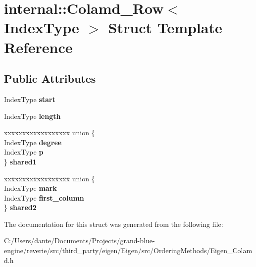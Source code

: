 \hypertarget{structinternal_1_1_colamd___row}{}\section{internal\+::Colamd\+\_\+\+Row$<$ Index\+Type $>$ Struct Template Reference}
\label{structinternal_1_1_colamd___row}
\subsection*{Public Attributes}
\begin{DoxyCompactItemize}
\item 
\mbox{\label{structinternal_1_1_colamd___row_ac6998584d9ff3a7eae40b632b0e63b43}} 
Index\+Type {\bfseries start}
\item 
\mbox{\label{structinternal_1_1_colamd___row_a061b6aba0ec750f7183a6ad248be7be6}} 
Index\+Type {\bfseries length}
\item 
\mbox{\label{structinternal_1_1_colamd___row_aa0956743d33cbd1625cd3174f37ac6b5}} 
\begin{tabbing}
xx\=xx\=xx\=xx\=xx\=xx\=xx\=xx\=xx\=\kill
union \{\\
\>IndexType {\bfseries degree}\\
\>IndexType {\bfseries p}\\
\} {\bfseries shared1}\\

\end{tabbing}\item 
\mbox{\label{structinternal_1_1_colamd___row_aa2af6d6cdeadc13001a73e42fd5130ff}} 
\begin{tabbing}
xx\=xx\=xx\=xx\=xx\=xx\=xx\=xx\=xx\=\kill
union \{\\
\>IndexType {\bfseries mark}\\
\>IndexType {\bfseries first\_column}\\
\} {\bfseries shared2}\\

\end{tabbing}\end{DoxyCompactItemize}


The documentation for this struct was generated from the following file\+:\begin{DoxyCompactItemize}
\item 
C\+:/\+Users/dante/\+Documents/\+Projects/grand-\/blue-\/engine/reverie/src/third\+\_\+party/eigen/\+Eigen/src/\+Ordering\+Methods/Eigen\+\_\+\+Colamd.\+h\end{DoxyCompactItemize}
